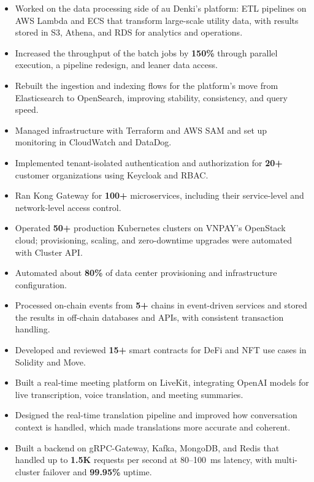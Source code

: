 \begin{itemize}
    \item Worked on the data processing side of au Denki's platform: ETL pipelines on AWS Lambda and ECS that transform large-scale utility data, with results stored in S3, Athena, and RDS for analytics and operations. %
    \item Increased the throughput of the batch jobs by \textbf{150\%} through parallel execution, a pipeline redesign, and leaner data access. %
    \item Rebuilt the ingestion and indexing flows for the platform's move from Elasticsearch to OpenSearch, improving stability, consistency, and query speed. %
    \item Managed infrastructure with Terraform and AWS SAM and set up monitoring in CloudWatch and DataDog. %
\end{itemize}

\jobVNPAY
\begin{itemize}
    \item Implemented tenant-isolated authentication and authorization for \textbf{20+} customer organizations using Keycloak and RBAC. %
    \item Ran Kong Gateway for \textbf{100+} microservices, including their service-level and network-level access control. %
    \item Operated \textbf{50+} production Kubernetes clusters on VNPAY's OpenStack cloud; provisioning, scaling, and zero-downtime upgrades were automated with Cluster API. %
    \item Automated about \textbf{80\%} of data center provisioning and infrastructure configuration. %
\end{itemize}

\jobEsolLabs
\begin{itemize}
    \item Processed on-chain events from \textbf{5+} chains in event-driven services and stored the results in off-chain databases and APIs, with consistent transaction handling. %
    \item Developed and reviewed \textbf{15+} smart contracts for DeFi and NFT use cases in Solidity and Move. %
\end{itemize}


\projMeetQ
\begin{itemize}
    \item Built a real-time meeting platform on LiveKit, integrating OpenAI models for live transcription, voice translation, and meeting summaries. %
    \item Designed the real-time translation pipeline and improved how conversation context is handled, which made translations more accurate and coherent. %
\end{itemize}

\projDattingQ
\begin{itemize}
    \item Built a backend on gRPC-Gateway, Kafka, MongoDB, and Redis that handled up to \textbf{1.5K} requests per second at 80--100~ms latency, with multi-cluster failover and \textbf{99.95\%} uptime. %
\end{itemize}

\cveducation


